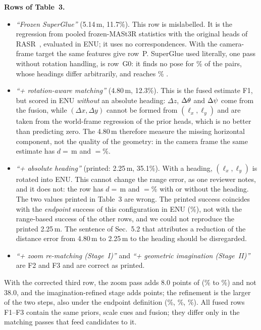 \noindent\textbf{Rows of Table~3.}
\begin{itemize}[leftmargin=*,itemsep=1pt,topsep=2pt]
\item \emph{``Frozen SuperGlue''} (5.14\,m, 11.7\%). This row is mislabelled. It is the regression from pooled frozen-MASt3R statistics with the original heads of RASR~\cite{liang2026rasr}, evaluated in ENU; it uses no correspondences. With the camera-frame target the same features give row~P. SuperGlue used literally, one pass without rotation handling, is row~G0: it finds no pose for \gZeroFail\% of the pairs, whose headings differ arbitrarily, and reaches \gZeroSRd\% \SRd.
\item \emph{``+ rotation-aware matching''} (4.80\,m, 12.3\%). This is the fused estimate F1, but scored in ENU \emph{without} an absolute heading: $\Delta z$, $\Delta\theta$ and $\Delta\psi$ come from the fusion, while $(\Delta x,\Delta y)$ cannot be formed from $(\ell_x,\ell_y)$ and are taken from the world-frame regression of the prior heads, which is no better than predicting zero. The 4.80\,m therefore measure the missing horizontal component, not the quality of the geometry: in the camera frame the same estimate has $d{=}$\fOneD\,m and \SRd{}${=}$\fOneSRd\%.
\item \emph{``+ absolute heading''} (printed: 2.25\,m, 35.1\%). With a heading, $(\ell_x,\ell_y)$ is rotated into ENU. This cannot change the range error, as one reviewer notes, and it does not: the row has $d{=}$\fOneD\,m and \SRd{}${=}$\fOneSRd\% with or without the heading. The two values printed in Table~3 are wrong. The printed success coincides with the \emph{endpoint} success of this configuration in ENU (\fOneEnuSRe\%), not with the range-based success of the other rows, and we could not reproduce the printed 2.25\,m. The sentence of Sec.~5.2 that attributes a reduction of the distance error from 4.80\,m to 2.25\,m to the heading should be disregarded.
\item \emph{``+ zoom re-matching (Stage~I)''} and \emph{``+ geometric imagination (Stage~II)''} are F2 and F3 and are correct as printed.
\end{itemize}
With the corrected third row, the zoom pass adds 8.0 points of \SRd{} (\fOneSRd\% to \SiCamSRd\%) and not 38.0, and the imagination-refined stage adds \gainSRd{} points; the refinement is the larger of the two steps, also under the endpoint definition (\fOneSRe\%, \SiCamSRe\%, \SiiCamSRe\%). All fused rows F1--F3 contain the same priors, scale cues and fusion; they differ only in the matching passes that feed candidates to it.

